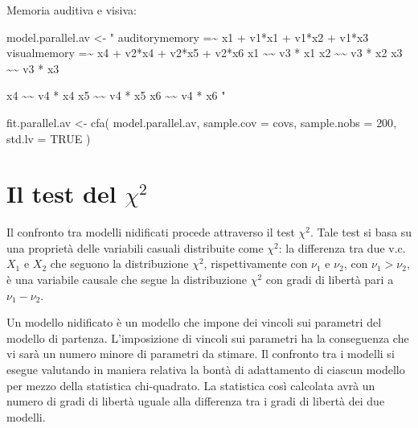 \documentclass[
  11pt,
]{krantz}
\makeatletter
\newenvironment{Shaded}{\begin{snugshade}}{\end{snugshade}}
\newcommand{\AttributeTok}[1]{\textcolor[rgb]{0.61,0.61,0.61}{#1}}
\newcommand{\ConstantTok}[1]{\textcolor[rgb]{0,0,0}{#1}}
\newcommand{\DecValTok}[1]{\textcolor[rgb]{0.06,0.06,0.06}{#1}}
\newcommand{\FunctionTok}[1]{\textcolor[rgb]{0,0,0}{#1}}
\newcommand{\NormalTok}[1]{#1}
\newcommand{\OtherTok}[1]{\textcolor[rgb]{0.37,0.37,0.37}{#1}}
\newcommand{\StringTok}[1]{\textcolor[rgb]{0.5,0.5,0.5}{#1}}
\newenvironment{kframe}{%
\medskip{}
\setlength{\fboxsep}{.8em}
 \def\at@end@of@kframe{}%
 \ifinner\ifhmode%
  \def\at@end@of@kframe{\end{minipage}}%
  \begin{minipage}{\columnwidth}%
 \fi\fi%
 \def\FrameCommand##1{\hskip\@totalleftmargin \hskip-\fboxsep
 \colorbox{shadecolor}{##1}\hskip-\fboxsep
     \hskip-\linewidth \hskip-\@totalleftmargin \hskip\columnwidth}%
 \MakeFramed {\advance\hsize-\width
   \@totalleftmargin\z@ \linewidth\hsize
   \@setminipage}}%
 {\par\unskip\endMakeFramed%
 \at@end@of@kframe}
\renewenvironment{Shaded}{\begin{kframe}}{\end{kframe}}
\theoremstyle{definition}
\theoremstyle{definition}
\theoremstyle{definition}
\theoremstyle{definition}
\theoremstyle{remark}
\makeatother
\begin{document}
Memoria auditiva e visiva:

\begin{Shaded}
\begin{Highlighting}[]
\NormalTok{model.parallel.av }\OtherTok{\textless{}{-}} \StringTok{"}
\StringTok{  auditorymemory =\textasciitilde{} x1 + v1*x1 + v1*x2 + v1*x3}
\StringTok{  visualmemory   =\textasciitilde{} x4 + v2*x4 + v2*x5 + v2*x6}
\StringTok{  x1 \textasciitilde{}\textasciitilde{} v3 * x1}
\StringTok{  x2 \textasciitilde{}\textasciitilde{} v3 * x2}
\StringTok{  x3 \textasciitilde{}\textasciitilde{} v3 * x3}

\StringTok{  x4 \textasciitilde{}\textasciitilde{} v4 * x4}
\StringTok{  x5 \textasciitilde{}\textasciitilde{} v4 * x5}
\StringTok{  x6 \textasciitilde{}\textasciitilde{} v4 * x6}
\StringTok{"}
\end{Highlighting}
\end{Shaded}

\begin{Shaded}
\begin{Highlighting}[]
\NormalTok{fit.parallel.av }\OtherTok{\textless{}{-}} \FunctionTok{cfa}\NormalTok{(}
\NormalTok{  model.parallel.av,}
  \AttributeTok{sample.cov =}\NormalTok{ covs,}
  \AttributeTok{sample.nobs =} \DecValTok{200}\NormalTok{,}
  \AttributeTok{std.lv =} \ConstantTok{TRUE}
\NormalTok{)}
\end{Highlighting}
\end{Shaded}

\hypertarget{il-test-del-chi2}{%
\section{\texorpdfstring{Il test del \(\chi^2\)}{Il test del \textbackslash chi\^{}2}}\label{il-test-del-chi2}}

Il confronto tra modelli nidificati procede attraverso il test \(\chi^2\). Tale test si basa su una proprietà delle variabili casuali distribuite come \(\chi^2\): la differenza tra due v.c. \(X_1\) e \(X_2\) che seguono la distribuzione \(\chi^2\), rispettivamente con \(\nu_1\) e \(\nu_2\), con \(\nu_1 > \nu_2\), è una variabile causale che segue la distribuzione \(\chi^2\) con gradi di libertà pari a \(\nu_1 - \nu_2\).

Un modello nidificato è un modello che impone dei vincoli sui parametri del modello di partenza. L'imposizione di vincoli sui parametri ha la conseguenza che vi sarà un numero minore di parametri da stimare. Il confronto tra i modelli si esegue valutando in maniera relativa la bontà di adattamento di ciascun modello per mezzo della statistica chi-quadrato. La statistica così calcolata avrà un numero di gradi di libertà uguale alla differenza tra i gradi di libertà dei due modelli.
\end{document}
